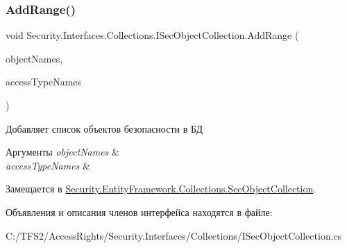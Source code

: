\subsubsection{\texorpdfstring{Add\+Range()}{AddRange()}}
{\footnotesize\ttfamily void Security.\+Interfaces.\+Collections.\+I\+Sec\+Object\+Collection.\+Add\+Range (\begin{DoxyParamCaption}\item[{I\+Enumerable$<$ string $>$}]{object\+Names,  }\item[{I\+Enumerable$<$ string $>$}]{access\+Type\+Names }\end{DoxyParamCaption})}



Добавляет список объектов безопасности в БД 


\begin{DoxyParams}{Аргументы}
{\em object\+Names} & \\
\hline
{\em access\+Type\+Names} & \\
\hline
\end{DoxyParams}


Замещается в \hyperlink{class_security_1_1_entity_framework_1_1_collections_1_1_sec_object_collection_a8947c78fa20e67345a737234a0558e41}{Security.\+Entity\+Framework.\+Collections.\+Sec\+Object\+Collection}.



Объявления и описания членов интерфейса находятся в файле\+:\begin{DoxyCompactItemize}
\item 
C\+:/\+T\+F\+S2/\+Access\+Rights/\+Security.\+Interfaces/\+Collections/I\+Sec\+Object\+Collection.\+cs\end{DoxyCompactItemize}
